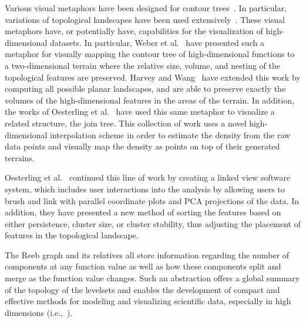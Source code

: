 Various visual metaphors have been designed for contour trees~\cite{PascucciCole-McLaughlinScorzelli2009,WeberBremerPascucci2012}.
%
In particular, variations of topological landscapes have been used extensively~\cite{BeketayevMorozovWeber2012,DemirBeketayevWeber2012,HarveyWang2010,OesterlingHeineJanicke2010,OesterlingHeineJanicke2011,WeberBremerPascucci2007}.
%
These visual metaphors have, or potentially have, capabilities for the visualization of high-dimensional datasets.
%
In particular, Weber et al.~\cite{WeberBremerPascucci2007} have presented such a metaphor for visually mapping the contour tree of high-dimensional functions to a two-dimensional terrain where the relative size, volume, and nesting of the topological features are preserved.
%
Harvey and Wang~\cite{HarveyWang2010} have extended this work by computing all possible planar landscapes, and are able to preserve exactly the volumes of the high-dimensional features in the areas of the terrain.
%
In addition, the works of Oesterling et al.~\cite{OesterlingHeineJanicke2010,OesterlingHeineJanicke2011} have used this same metaphor to visualize a related structure, the join tree.
%
This collection of work uses a novel high-dimensional interpolation scheme in order to estimate the density from the raw data points and visually map the density as points on top of their generated terrains.

Oesterling et al.~\cite{OesterlingHeineGunther2013} continued this line of work by creating a linked view software system, which includes user interactions into the analysis by allowing users to brush and link with parallel coordinate plots and PCA projections of the data.
%
In addition, they have presented a new method of sorting the features based on either persistence, cluster size, or cluster stability, thus adjusting the placement of features in the topological landscape.


The Reeb graph and its relatives all store information regarding the number of components at any function value as well as how these components split and merge as the function value changes.
%
Such an abstraction offers a global summary of the topology of the levelsets and enables the development of compact and effective methods for modeling and visualizing scientific data, especially in high dimensions (i.e.,~\cite{SinghMemoliCarlsson2007,NicolauLevineCarlsson2011}).


